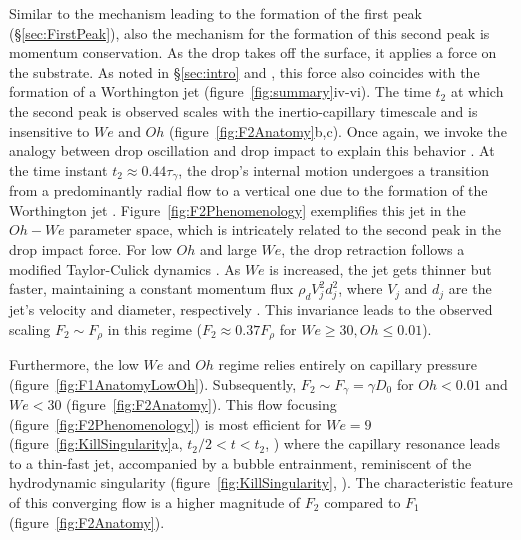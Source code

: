 \documentclass{jfm}
\begin{document}
Similar to the mechanism leading to the formation of the first peak (\S\ref{sec:FirstPeak}), also the mechanism for the formation of this second peak is momentum conservation. As the drop takes off the surface, it applies a force on the substrate. As noted in \S\ref{sec:intro} and \citet{zhang2022impact}, this force also coincides with the formation of a Worthington jet (figure~\ref{fig:summary}iv-vi). The time $t_2$ at which the second peak is observed scales with the inertio-capillary timescale and is insensitive to $We$ and $Oh$ (figure~\ref{fig:F2Anatomy}b,c). Once again, we invoke the analogy between drop oscillation and drop impact to explain this behavior  \citep{Richard2002, chevy2012liquid}. At the time instant $t_2 \approx 0.44\tau_\gamma$, the drop's internal motion undergoes a transition from a predominantly radial flow to a vertical one due to the formation of the Worthington jet \citep{chantelot2018rebonds, zhang2022impact}. Figure~\ref{fig:F2Phenomenology} exemplifies this jet in the $Oh-We$ parameter space, which is intricately related to the second peak in the drop impact force. For low $Oh$ and large $We$, the drop retraction follows a modified Taylor-Culick dynamics \citep{bartolo2005retraction, Eggers2010, sanjay-2022-arxiv}. As $We$ is increased, the jet gets thinner but faster, maintaining a constant momentum flux $\rho_dV_j^2d_j^2$, where $V_j$ and $d_j$ are the jet's velocity and diameter, respectively \citep[figure~\ref{fig:F2Phenomenology},][]{zhang2022impact}. This invariance leads to the observed scaling $F_2 \sim F_\rho$ in this regime ($F_2 \approx 0.37F_\rho$ for $We \ge 30, Oh \le 0.01$).

Furthermore, the low $We$ and $Oh$ regime relies entirely on capillary pressure (figure~\ref{fig:F1AnatomyLowOh}). Subsequently, $F_2 \sim F_\gamma = \gamma D_0$ for $Oh < 0.01$ and $We < 30$ (figure~\ref{fig:F2Anatomy}). This flow focusing (figure~\ref{fig:F2Phenomenology}) is most efficient for $We = 9$ (figure~\ref{fig:KillSingularity}a, $t_2/2 < t < t_2$, \citealp{renardy2003pyramidal, Bartolo2006Singular}) where the capillary resonance leads to a thin-fast jet, accompanied by a bubble entrainment, reminiscent of the hydrodynamic singularity (figure~\ref{fig:KillSingularity}, \citealp{zhang2022impact, sanjay_lohse_jalaal_2021}). The characteristic feature of this converging flow is a higher magnitude of $F_2$ compared to $F_1$ (figure~\ref{fig:F2Anatomy}). 
\end{document}
